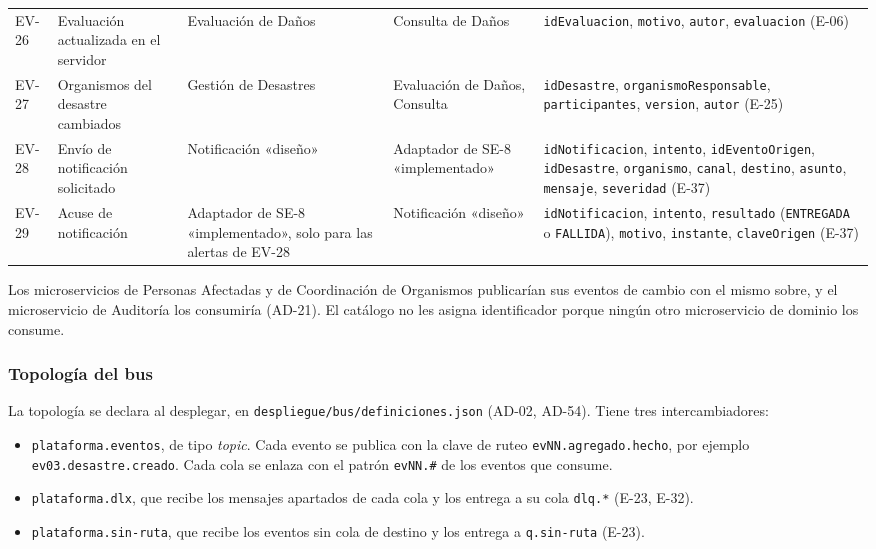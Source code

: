\documentclass[11pt,letterpaper]{article}
\providecommand{\br}{\discretionary{}{}{}}
\begin{document}
\begin{longtable}{L{1.1cm} L{2.7cm} L{2.4cm} L{2.9cm} L{6.2cm}}
EV-26 & Evaluación actualizada en el servidor & Evaluación de Daños & Consulta de Daños &
\texttt{idEvaluacion}, \texttt{motivo}, \texttt{autor}, \texttt{evaluacion} (E-06) \\
EV-27 & Organismos del desastre cambiados & Gestión de Desastres & Evaluación de Daños, Consulta &
\texttt{idDesastre}, \texttt{organismoResponsable}, \texttt{participantes}, \texttt{version},
\texttt{autor} (E-25) \\
EV-28 & Envío de notificación solicitado & Notificación «diseño» & Adaptador de SE-8 «implementado» &
\texttt{idNotificacion}, \texttt{intento}, \texttt{idEventoOrigen}, \texttt{idDesastre},
\texttt{organismo}, \texttt{canal}, \texttt{destino}, \texttt{asunto}, \texttt{mensaje},
\texttt{severidad} (E-37) \\
EV-29 & Acuse de notificación & Adaptador de SE-8 «implementado», solo para las alertas de EV-28 &
Notificación «diseño» &
\texttt{idNotificacion}, \texttt{intento}, \texttt{resultado} (\texttt{ENTREGADA} o
\texttt{FALLIDA}), \texttt{motivo}, \texttt{instante}, \texttt{claveOrigen} (E-37) \\
\end{longtable}
\endgroup

Los microservicios de Personas Afectadas y de Coordinación de Organismos publicarían sus eventos de
cambio con el mismo sobre, y el microservicio de Auditoría los consumiría (AD-21). El catálogo no
les asigna identificador porque ningún otro microservicio de dominio los consume.

\subsubsection{Topología del bus}
\label{sec:topologia-bus}

La topología se declara al desplegar, en \texttt{despliegue/\br{}bus/\br{}definiciones.\br{}json} (AD-02, AD-54).
Tiene tres intercambiadores:

\begin{itemize}
  \item \texttt{plataforma.\br{}eventos}, de tipo \emph{topic}. Cada evento se publica con la clave de
        ruteo \texttt{evNN.\br{}agregado.\br{}hecho}, por ejemplo \texttt{ev03.\br{}desastre.\br{}creado}. Cada cola se
        enlaza con el patrón \texttt{evNN.\#} de los eventos que consume.
  \item \texttt{plataforma.\br{}dlx}, que recibe los mensajes apartados de cada cola y los entrega a su
        cola \texttt{dlq.*} (E-23, E-32).
  \item \texttt{plataforma.\br{}sin-\br{}ruta}, que recibe los eventos sin cola de destino y los entrega a
        \texttt{q.sin-ruta} (E-23).
\end{itemize}
\end{document}

